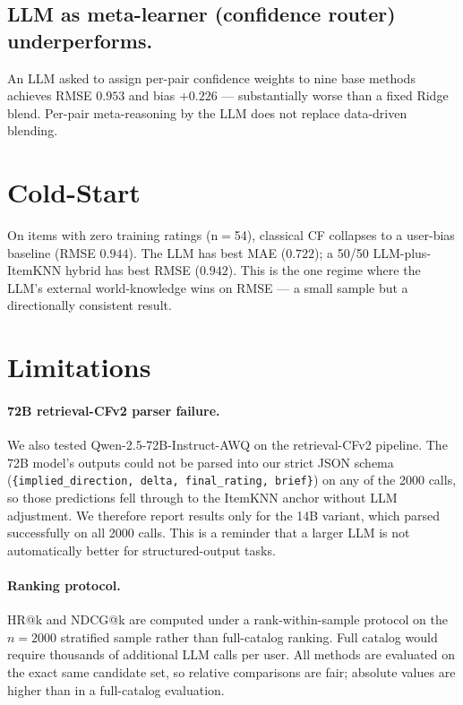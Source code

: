 \documentclass[11pt,a4paper]{article}
\begin{document}
\subsection{LLM as meta-learner (confidence router) underperforms.}
An LLM asked to assign per-pair confidence weights to nine base methods
achieves RMSE $0.953$ and bias $+0.226$ — substantially worse than a
fixed Ridge blend. Per-pair meta-reasoning by the LLM does not
replace data-driven blending.

\section{Cold-Start}

On items with zero training ratings (n$=$54), classical CF collapses to a
user-bias baseline (RMSE $0.944$). The LLM has best MAE ($0.722$); a
50/50 LLM-plus-ItemKNN hybrid has best RMSE ($0.942$). This is the one
regime where the LLM's external world-knowledge wins on RMSE — a small
sample but a directionally consistent result.

\section{Limitations}
\label{sec:limitations}

\paragraph{72B retrieval-CFv2 parser failure.}
We also tested Qwen-2.5-72B-Instruct-AWQ on the retrieval-CFv2 pipeline.
The 72B model's outputs could not be parsed into our strict
JSON schema (\texttt{\{implied\_direction, delta, final\_rating, brief\}}) on
any of the 2000 calls, so those predictions fell through to the ItemKNN
anchor without LLM adjustment. We therefore report results only for the
14B variant, which parsed successfully on all 2000 calls. This is a
reminder that a larger LLM is not automatically better for
structured-output tasks.

\paragraph{Ranking protocol.}
HR@k and NDCG@k are computed under a rank-within-sample protocol on
the $n{=}2000$ stratified sample rather than full-catalog ranking. Full
catalog would require thousands of additional LLM calls
per user. All methods are evaluated on the exact same candidate set, so
relative comparisons are fair; absolute values are higher than in a
full-catalog evaluation.
\end{document}
